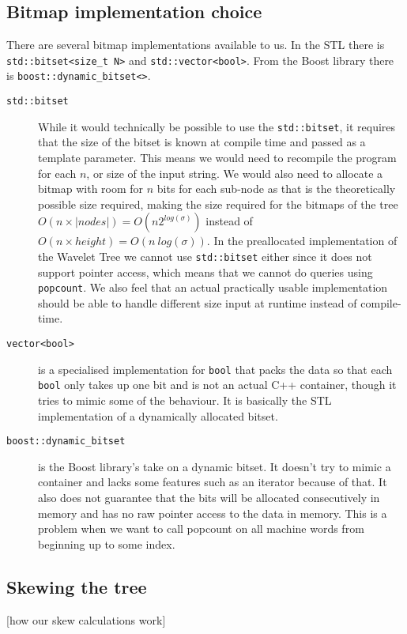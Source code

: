 \subsection{Bitmap implementation choice}
There are several bitmap implementations available to us. In the STL there is \texttt{std::bitset<size\_t N>} and \texttt{std::vector<bool>}. From the Boost library there is \texttt{boost::dynamic\_bitset<>}.
\begin{description}
\item[\texttt{std::bitset}] While it would technically be possible to use the \texttt{std::bitset}, it requires that the size of the bitset is known at compile time and passed as a template parameter. This means we would need to recompile the program for each $n$, or size of the input string. 
We would also need to allocate a bitmap with room for $n$ bits for each sub-node as that is the theoretically possible size required, making the size required for the bitmaps of the tree $O(n \times |nodes|) = O(n2^{log(\sigma)})$ instead of $O(n \times height) = O(n~log(\sigma))$.
In the preallocated implementation of the Wavelet Tree we cannot use \texttt{std::bitset} either since it does not support pointer access, which means that we cannot do queries using \texttt{popcount}.
We also feel that an actual practically usable implementation should be able to handle different size input at runtime instead of compile-time. 

\item[\texttt{vector<bool>}] is a specialised implementation for \texttt{bool} that packs the data so that each \texttt{bool} only takes up one bit and is not an actual C++ container, though it tries to mimic some of the behaviour. 
It is basically the STL implementation of a dynamically allocated bitset.

\item[\texttt{boost::dynamic\_bitset}] is the Boost library's take on a dynamic bitset. 
It doesn't try to mimic a container and lacks some features such as an iterator because of that. 
It also does not guarantee that the bits will be allocated consecutively in memory and has no raw pointer access to the data in memory. 
This is a problem when we want to call popcount on all machine words from beginning up to some index.
\end{description}

\subsection{Skewing the tree}
[how our skew calculations work]
